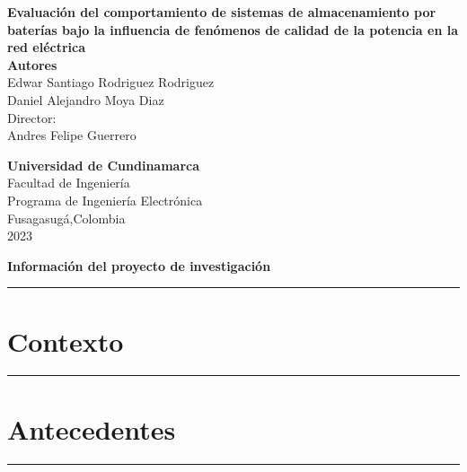 \documentclass[12pt,twoside]{article}
\date{}
\begin{document}
\begin{titlepage}
\begin{center}

{\Large \textbf{Evaluación del comportamiento de sistemas de almacenamiento por baterías bajo la influencia de fenómenos de calidad de la potencia en la red eléctrica}}\\%
\vspace*{2\baselineskip}
\textbf{Autores}\\
\vspace*{0.2\baselineskip}
Edwar Santiago Rodriguez Rodriguez \\[0.2cm]
Daniel Alejandro Moya Diaz\\[0.2cm]

\vspace*{3.5\baselineskip}
Director:\\
Andres Felipe Guerrero\\
\vspace*{2\baselineskip}


\vfill %
\textbf{Universidad de Cundinamarca} \\
Facultad de Ingeniería\\
Programa de Ingeniería Electrónica\\
Fusagasug\'{a},Colombia\\
2023

\end{center}
\end{titlepage}
\newpage
\begin{center}
{\LARGE \textbf{Información del proyecto de investigación }}
\end{center}
\vspace*{0.09\baselineskip}
\hrule
\vspace*{0.2\baselineskip}

\newpage
\section{Contexto}
\vspace*{0.08\baselineskip}
\hrule
\vspace*{0.2\baselineskip}


\newpage
\section{Antecedentes}
\vspace*{0.08\baselineskip}
\hrule
\vspace*{0.7\baselineskip}

\end{document}
